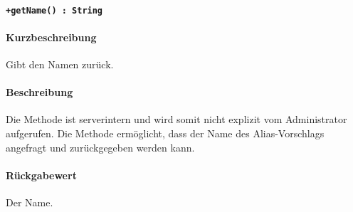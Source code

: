 \paragraph*{\texttt{+getName() : String}}%
\paragraph*{Kurzbeschreibung}
Gibt den Namen zurück.
\paragraph*{Beschreibung}
Die Methode ist serverintern und wird somit nicht explizit vom Administrator aufgerufen.
Die Methode ermöglicht, dass der Name des Alias-Vorschlags angefragt und zurückgegeben werden kann.
\paragraph*{Rückgabewert}
Der Name.
